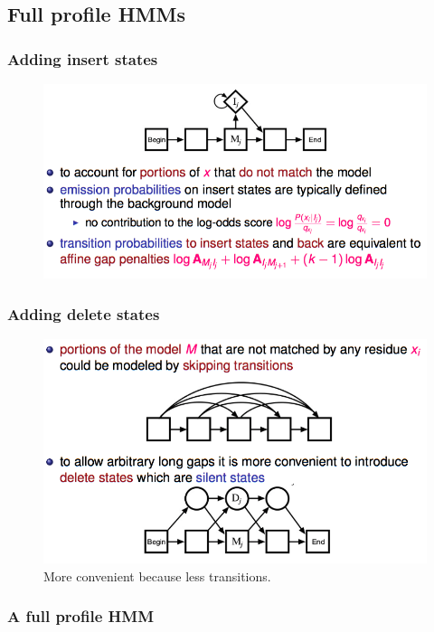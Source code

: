 \subsection{Full profile HMMs}

\subsubsection{Adding insert states}

\begin{figure}[H]
	\centering
	\includegraphics[scale=0.5]{images/38_insert.png}
\end{figure}

\subsubsection{Adding delete states}

\begin{figure}[H]
	\centering
	\includegraphics[scale=0.5]{images/39_delete.png}
	\caption{More convenient because less transitions.}
\end{figure}

\subsubsection{A full profile HMM}

